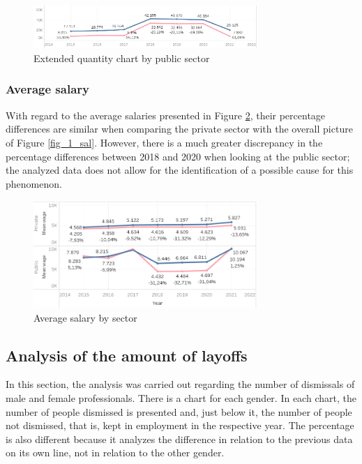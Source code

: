 \begin{figure}[htbp]
	\centerline{
		\includegraphics[width=85mm]{assets/3_1_qnt_pubpriv.PNG}
	}
	\caption{Extended quantity chart by public sector}
	\label{fig_3_1_qnt_pubpriv}
\end{figure}

\subsubsection{Average salary}

With regard to the average salaries presented in Figure \ref{fig_3_sal_pubpriv}, their percentage differences are similar when comparing the private sector with the overall picture of Figure \ref{fig_1_sal}. However, there is a much greater discrepancy in the percentage differences between 2018 and 2020 when looking at the public sector; the analyzed data does not allow for the identification of a possible cause for this phenomenon.

\begin{figure}[htbp]
	\centerline{
		\includegraphics[width=85mm]{assets/3_sal_pubpriv.PNG}
	}
	\caption{Average salary by sector}
	\label{fig_3_sal_pubpriv}
\end{figure}

\subsection{Analysis of the amount of layoffs}

In this section, the analysis was carried out regarding the number of dismissals of male and female professionals. There is a chart for each gender. In each chart, the number of people dismissed is presented and, just below it, the number of people not dismissed, that is, kept in employment in the respective year. The percentage is also different because it analyzes the difference in relation to the previous data on its own line, not in relation to the other gender.

